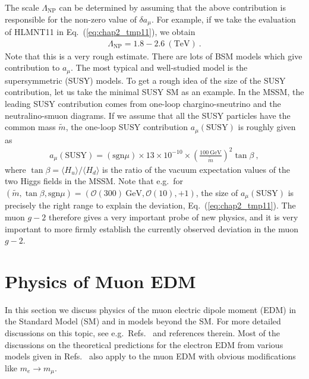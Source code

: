 %
The scale $\Lambda_{\text{NP}}$ can be determined 
by assuming that the above contribution is responsible
for the non-zero value of $\delta a_\mu$.  For example,
if we take the evaluation of HLMNT11
in Eq.~(\ref{eq:chap2_tmp11}), we obtain
%
\begin{align}
 \Lambda_{\text{NP}} = 1.8 - 2.6 ~ (\text{TeV})~.
\end{align}
%
Note that this is a very rough estimate.
There are lots of BSM models which give contribution
to $a_\mu$.  
The most typical and well-studied model is the
supersymmetric (SUSY) models.  
To get a rough idea of the size of the SUSY contribution,
let us take the minimal SUSY SM as an example. 
In the MSSM, the leading SUSY contribution comes from
one-loop chargino-sneutrino and the neutralino-smuon diagrams.  
If we assume that all the SUSY particles have the
common mass $\tilde{m}$, the one-loop SUSY contribution
$a_\mu(\text{SUSY})$ is roughly given as~\cite{Czarnecki:2001pv}
%
\begin{align}
 a_\mu(\text{SUSY}) = (\text{sgn} \mu)  \times 13 \times 10^{-10}
\times \left( \frac{100 ~\text{GeV}}{\tilde{m}}\right)^2 \tan\beta~,
\end{align}
%
where $\tan\beta = \langle H_u \rangle/ \langle H_d \rangle$ 
is the ratio of the vacuum expectation values of the two Higgs
fields in the MSSM.  Note that e.g.\ for 
$(\tilde{m}, \tan\beta, \text{sgn}\mu) 
= ({\mathcal O}(300) ~\text{GeV}, {\mathcal O}(10), +1)$,
the size of $a_\mu(\text{SUSY})$ is precisely the right
range to explain the deviation, Eq.~(\ref{eq:chap2_tmp11}).  
The muon $g-2$ therefore gives a very important probe
of new physics, and it is very important to more firmly 
establish the currently observed deviation in the muon $g-2$.





\section{Physics of Muon EDM}

In this section we discuss physics of the muon electric dipole
moment (EDM) in the Standard Model (SM) and in models beyond
the SM.  For more detailed discussions on this topic, 
see e.g.\ Refs.~\cite{Barr:1988mc, Bernreuther:1990jx, Pospelov:2005pr, 
Fukuyama:2012np, Fukuyama:2015yya} and references therein. 
Most of the discussions on the theoretical predictions for
the electron EDM from various models given in
Refs.~\cite{Barr:1988mc, Bernreuther:1990jx, Pospelov:2005pr,
Fukuyama:2012np, Fukuyama:2015yya} also apply to the
muon EDM with obvious modifications like $m_e \to m_\mu$. 

